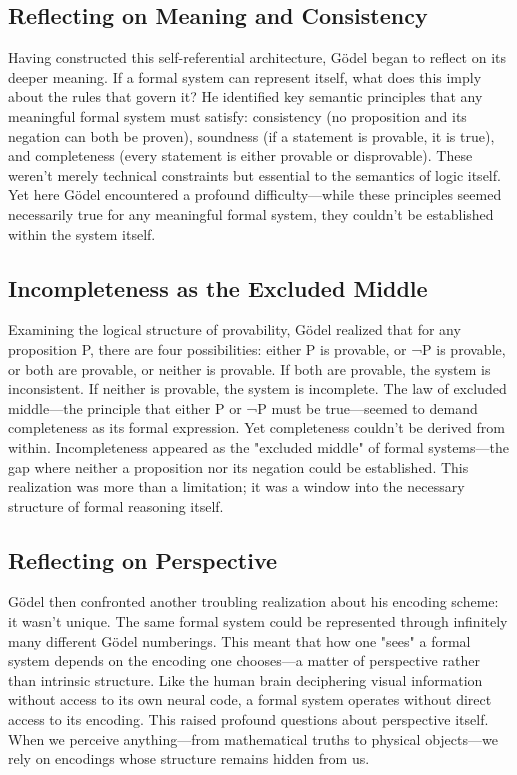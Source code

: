 \documentclass[runningheads]{llncs}
\begin{document}
\subsection{Reflecting on Meaning and Consistency}

Having constructed this self-referential architecture, Gödel began to reflect on its deeper meaning. If a formal system can represent itself, what does this imply about the rules that govern it? He identified key semantic principles that any meaningful formal system must satisfy: consistency (no proposition and its negation can both be proven), soundness (if a statement is provable, it is true), and completeness (every statement is either provable or disprovable). These weren't merely technical constraints but essential to the semantics of logic itself. Yet here Gödel encountered a profound difficulty—while these principles seemed necessarily true for any meaningful formal system, they couldn't be established within the system itself.

\subsection{Incompleteness as the Excluded Middle}

Examining the logical structure of provability, Gödel realized that for any proposition P, there are four possibilities: either P is provable, or ¬P is provable, or both are provable, or neither is provable. If both are provable, the system is inconsistent. If neither is provable, the system is incomplete. The law of excluded middle—the principle that either P or ¬P must be true—seemed to demand completeness as its formal expression. Yet completeness couldn't be derived from within. Incompleteness appeared as the "excluded middle" of formal systems—the gap where neither a proposition nor its negation could be established. This realization was more than a limitation; it was a window into the necessary structure of formal reasoning itself.

\subsection{Reflecting on Perspective}

Gödel then confronted another troubling realization about his encoding scheme: it wasn't unique. The same formal system could be represented through infinitely many different Gödel numberings. This meant that how one "sees" a formal system depends on the encoding one chooses—a matter of perspective rather than intrinsic structure. Like the human brain deciphering visual information without access to its own neural code, a formal system operates without direct access to its encoding. This raised profound questions about perspective itself. When we perceive anything—from mathematical truths to physical objects—we rely on encodings whose structure remains hidden from us.
\end{document}
